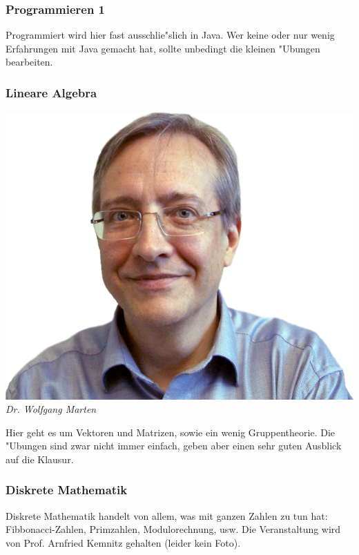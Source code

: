 \subsubsection{Programmieren 1}

Programmiert wird hier fast ausschlie"slich in Java. Wer keine oder nur wenig Erfahrungen mit Java gemacht hat, sollte unbedingt die kleinen "Ubungen bearbeiten.

\subsubsection{Lineare Algebra}

\includegraphics[width=0.8\linewidth]{bilder/dozenten/marten_frei.png}\\
\textit{Dr. Wolfgang Marten}

Hier geht es um Vektoren und Matrizen, sowie ein wenig Gruppentheorie.
Die "Ubungen sind zwar nicht immer einfach, geben aber einen sehr guten Ausblick auf die Klausur.

\subsubsection{Diskrete Mathematik}

Diskrete Mathematik handelt von allem, was mit ganzen Zahlen zu tun hat: Fibbonacci-Zahlen, Primzahlen, Modulorechnung, usw.
Die Veranstaltung wird von Prof. Arnfried Kemnitz gehalten (leider kein Foto).


